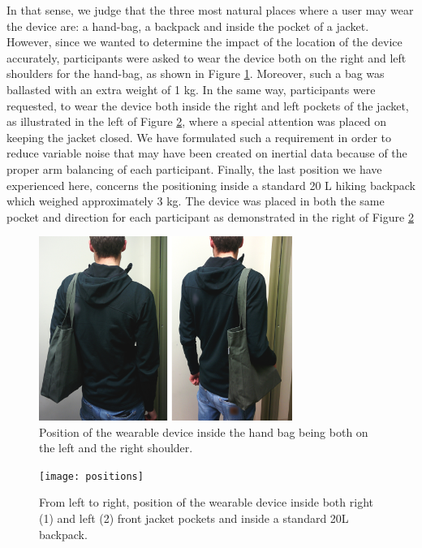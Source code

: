 \documentclass[conference]{IEEEtran}
\begin{document}
In that sense, we judge that the three most natural places where a user may wear the device are: a hand-bag, a backpack and inside the pocket of a jacket. However, since we wanted to determine the impact of the location of the device accurately, participants were asked to wear the device both on the right and left shoulders for the hand-bag, as shown in Figure \ref{fig:positions_hand_bags}. Moreover, such a bag was ballasted with an extra weight of 1 kg. In the same way, participants were requested, to wear the device both inside the right and left pockets of the jacket, as illustrated in the left of Figure \ref{fig:positions}, where a special attention was placed on keeping the jacket closed. We have formulated such a requirement in order to reduce variable noise that may have been created on inertial data because of the proper arm balancing of each participant. Finally, the last position we have experienced here, concerns the positioning inside a standard 20 L hiking backpack which weighed approximately 3 kg. The device was placed in both the same pocket and direction for each participant as demonstrated in the right of Figure \ref{fig:positions}

\begin{figure}[!t]
  \centering
  \includegraphics[width=3.25in]{positions_hand_bags}
  \caption{Position of the wearable device inside the hand bag being both on the left and the right shoulder.}
  \label{fig:positions_hand_bags}
\end{figure}

\begin{figure}[!b]
  \centering
  \texttt{[image: positions]}
  \caption{From left to right, position of the wearable device inside both right (1) and left (2) front jacket pockets and inside a standard 20L backpack.}
  \label{fig:positions}
\end{figure}
\end{document}
